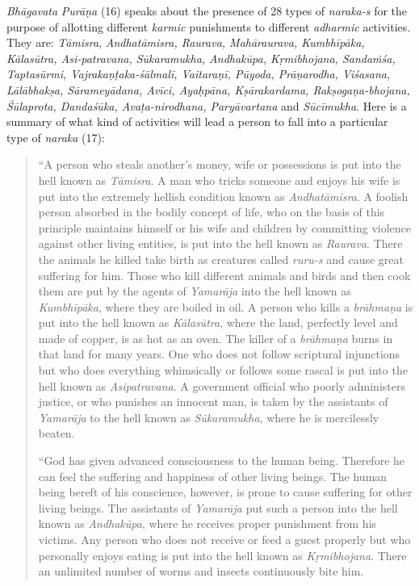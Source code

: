 {\emph{Bhāgavata} \emph{Purāṇa} (16) speaks about the presence of 28 types of \emph{naraka-s} for the purpose of allotting different \emph{karmic} punishments to different \emph{adharmic} activities. They are: \emph{Tāmisra}, \emph{Andhatāmisra, Raurava, Mahāraurava, Kumbhīpāka, Kālasūtra, Asi-patravana, Sūkaramukha, Andhakūpa, Kṛmibhojana, Sandaṁśa, Taptasūrmi, Vajrakaṇṭaka-śālmalī, Vaitaraṇī, Pūyoda, Prāṇarodha, Viśasana, Lālābhakṣa, Sārameyādana, Avīci, Ayaḥpāna, Kṣārakardama, Rakṣogaṇa-bhojana, Śūlaprota, Dandaśūka, Avaṭa-nirodhana, Paryāvartana} and \emph{Sūcīmukha}. Here is a summary of what kind of activities will lead a person to fall into a particular type of \emph{naraka} (17):

\begin{quote}
``A person who steals another's money, wife or possessions is put into the hell known as \emph{Tāmisra}. A man who tricks someone and enjoys his wife is put into the extremely hellish condition known as \emph{Andhatāmisra}. A foolish person absorbed in the bodily concept of life, who on the basis of this principle maintains himself or his wife and children by committing violence against other living entities, is put into the hell known as \emph{Raurava}. There the animals he killed take birth as creatures called \emph{ruru-s} and cause great suffering for him. Those who kill different animals and birds and then cook them are put by the agents of \emph{Yamarāja} into the hell known as \emph{Kumbhīpāka}, where they are boiled in oil. A person who kills a \emph{brāhmaṇa} is put into the hell known as \emph{Kālasūtra}, where the land, perfectly level and made of copper, is as hot as an oven. The killer of a \emph{brāhmaṇa} burns in that land for many years. One who does not follow scriptural injunctions but who does everything whimsically or follows some rascal is put into the hell known as \emph{Asipatravana}. A government official who poorly administers justice, or who punishes an innocent man, is taken by the assistants of \emph{Yamarāja} to the hell known as \emph{Sūkaramukha}, where he is mercilessly beaten.

``God has given advanced consciousness to the human being. Therefore he can feel the suffering and happiness of other living beings. The human being bereft of his conscience, however, is prone to cause suffering for other living beings. The assistants of \emph{Yamarāja} put such a person into the hell known as \emph{Andhakūpa}, where he receives proper punishment from his victims. Any person who does not receive or feed a guest properly but who personally enjoys eating is put into the hell known as \emph{Kṛmibhojana}. There an unlimited number of worms and insects continuously bite him.


\end{quote}}
